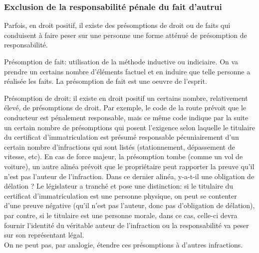 \documentclass[10pt, a4paper, openany]{book}
\begin{document}
\subsubsection{Exclusion de la responsabilité pénale du fait d'autrui}

Parfois, en droit positif, il existe des présomptions de droit ou de faits qui conduisent à faire peser sur une personne une forme atténué de présomption de responsabilité. 


Présomption de fait: utilisation de la méthode inductive ou indiciaire. On va prendre un certains nombre d'éléments factuel et en induire que telle personne a réalisée les faits. La présomption de fait est une oeuvre de l'esprit.


Présomption de droit: il existe en droit positif un certains nombre, relativement élevé, de présomptions de droit. Par exemple, le code de la route prévoit que le conducteur est pénalement responsable, mais ce même code indique par la suite un certain nombre de présomptions qui posent l'exigence selon laquelle le titulaire du certificat d'immatriculation est présumé responsable pécuniairement d'un certain nombre d'infractions qui sont listés (stationnement, dépassement de vitesse, etc). En cas de force majeur, la présomption tombe (comme un vol de voiture), un autre alinéa prévoit que le propriétaire peut rapporter la preuve qu'il n'est pas l'auteur de l'infraction. Dans ce dernier alinéa, y-a-t-il une obligation de délation ? Le législateur a tranché et pose une distinction: si le titulaire du certificat d'immatriculation est une personne physique, on peut se contenter d'une preuve négative (qu'il n'est pas l'auteur, donc pas d'obligation de délation), par contre, si le titulaire est une personne morale, dans ce cas, celle-ci devra fournir l'identité du véritable auteur de l'infraction ou la responsabilité va peser sur son représentant légal. \\
On ne peut pas, par analogie, étendre ces présomptions à d'autres infractions. 
\end{document}
